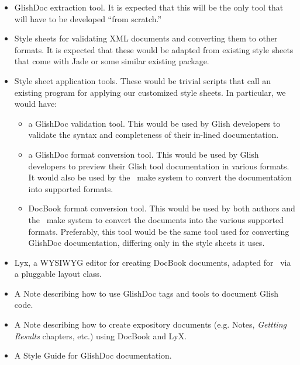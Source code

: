 \begin{itemize}

\item GlishDoc extraction tool.  It is expected that this will be the
only tool that will have to be developed ``from scratch.''

\item Style sheets for validating XML documents and converting them to
other formats.  It is expected that these would be adapted from
existing style sheets that come with Jade or some similar existing
package.  

\item Style sheet application tools.  These would be trivial scripts
that call an existing program for applying our customized style
sheets.  In particular, we would have:

\begin{itemize}

\item a GlishDoc validation tool.  This would be used by Glish
developers to validate the syntax and completeness of their in-lined
documentation.  

\item a GlishDoc format conversion tool.  This would be used by Glish
developers to preview their Glish tool documentation in various
formats.  It would also be used by the \aipspp\ make system to convert
the documentation into supported formats.  

\item DocBook format conversion tool.  This would be used by both
authors and the \aipspp\ make system to convert the documents into the
various supported formats.  Preferably, this tool would be the same
tool used for converting GlishDoc documentation, differing only in the
style sheets it uses.

\end{itemize}

\item Lyx, a WYSIWYG editor for creating DocBook documents, adapted
for \aipspp\ via a pluggable layout class.  

\item A Note describing how to use GlishDoc tags and tools to document
Glish code.

\item A Note describing how to create expository documents
(e.g. Notes, {\it Gettting Results} chapters, etc.) using DocBook and
LyX.  

\item A Style Guide for GlishDoc documentation.

\end{itemize}

